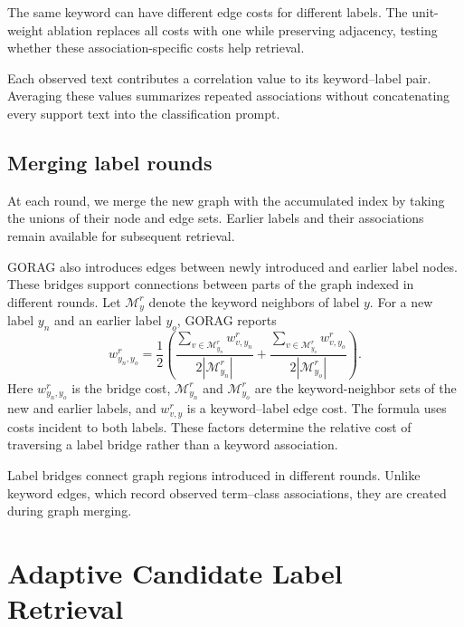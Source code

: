 The same keyword can have different edge costs for different labels. The unit-weight ablation replaces all costs with one while preserving adjacency, testing whether these association-specific costs help retrieval.

Each observed text contributes a correlation value to its keyword--label pair. Averaging these values summarizes repeated associations without concatenating every support text into the classification prompt.

\subsection{Merging label rounds}
\label{sec:gorag:merge}

At each round, we merge the new graph with the accumulated index by taking the unions of their node and edge sets. Earlier labels and their associations remain available for subsequent retrieval.

GORAG also introduces edges between newly introduced and earlier label nodes. These bridges support connections between parts of the graph indexed in different rounds. Let $\mathcal{M}_y^r$ denote the keyword neighbors of label $y$. For a new label $y_n$ and an earlier label $y_o$, GORAG reports
\begin{equation}
w_{y_n,y_o}^r=\frac{1}{2}\left(
\frac{\sum_{v\in\mathcal{M}_{y_n}^r}w_{v,y_n}^r}{2|\mathcal{M}_{y_n}^r|}
+\frac{\sum_{v\in\mathcal{M}_{y_o}^r}w_{v,y_o}^r}{2|\mathcal{M}_{y_o}^r|}
\right).
\label{eq:gorag:labelbridge}
\end{equation}
Here $w_{y_n,y_o}^r$ is the bridge cost, $\mathcal M_{y_n}^r$ and $\mathcal M_{y_o}^r$ are the keyword-neighbor sets of the new and earlier labels, and $w_{v,y}^r$ is a keyword--label edge cost. The formula uses costs incident to both labels. These factors determine the relative cost of traversing a label bridge rather than a keyword association.

Label bridges connect graph regions introduced in different rounds. Unlike keyword edges, which record observed term--class associations, they are created during graph merging.

\section{Adaptive Candidate Label Retrieval}
\label{sec:gorag:retrieval}


